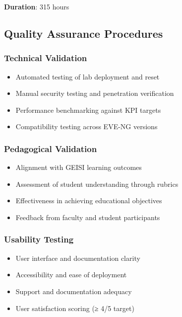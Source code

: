 \textbf{Duration}: 315 hours

\subsection{Quality Assurance Procedures}

\subsubsection{Technical Validation}

\begin{itemize}
\tightlist
\item
  Automated testing of lab deployment and reset
\item
  Manual security testing and penetration verification
\item
  Performance benchmarking against KPI targets
\item
  Compatibility testing across EVE-NG versions
\end{itemize}

\subsubsection{Pedagogical Validation}

\begin{itemize}
\tightlist
\item
  Alignment with GEISI learning outcomes
\item
  Assessment of student understanding through rubrics
\item
  Effectiveness in achieving educational objectives
\item
  Feedback from faculty and student participants
\end{itemize}

\subsubsection{Usability Testing}

\begin{itemize}
\tightlist
\item
  User interface and documentation clarity
\item
  Accessibility and ease of deployment
\item
  Support and documentation adequacy
\item
  User satisfaction scoring (≥ 4/5 target)
\end{itemize}

